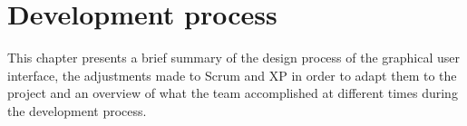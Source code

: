 \chapter{Development process}
\label{sec:devProcess}
This chapter presents a brief summary of the design process of the graphical user interface, the adjustments made to Scrum and XP in order to adapt them to the project and an overview of what the team accomplished at different times during the development process. 





